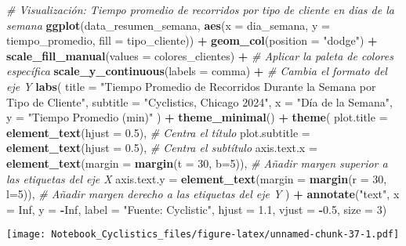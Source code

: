 \documentclass[
]{article}
\newenvironment{Shaded}{\begin{snugshade}}{\end{snugshade}}
\newcommand{\AttributeTok}[1]{\textcolor[rgb]{0.13,0.29,0.53}{#1}}
\newcommand{\CommentTok}[1]{\textcolor[rgb]{0.56,0.35,0.01}{\textit{#1}}}
\newcommand{\ConstantTok}[1]{\textcolor[rgb]{0.56,0.35,0.01}{#1}}
\newcommand{\DecValTok}[1]{\textcolor[rgb]{0.00,0.00,0.81}{#1}}
\newcommand{\FloatTok}[1]{\textcolor[rgb]{0.00,0.00,0.81}{#1}}
\newcommand{\FunctionTok}[1]{\textcolor[rgb]{0.13,0.29,0.53}{\textbf{#1}}}
\newcommand{\NormalTok}[1]{#1}
\newcommand{\SpecialCharTok}[1]{\textcolor[rgb]{0.81,0.36,0.00}{\textbf{#1}}}
\newcommand{\StringTok}[1]{\textcolor[rgb]{0.31,0.60,0.02}{#1}}
\begin{document}
\begin{Shaded}
\begin{Highlighting}[]
\CommentTok{\# Visualización: Tiempo promedio  de recorridos por tipo de cliente en dias de la semana}
\FunctionTok{ggplot}\NormalTok{(data\_resumen\_semana, }\FunctionTok{aes}\NormalTok{(}\AttributeTok{x =}\NormalTok{ dia\_semana, }\AttributeTok{y =}\NormalTok{ tiempo\_promedio, }\AttributeTok{fill =}\NormalTok{ tipo\_cliente)) }\SpecialCharTok{+}
  \FunctionTok{geom\_col}\NormalTok{(}\AttributeTok{position =} \StringTok{"dodge"}\NormalTok{) }\SpecialCharTok{+}
  \FunctionTok{scale\_fill\_manual}\NormalTok{(}\AttributeTok{values =}\NormalTok{ colores\_clientes) }\SpecialCharTok{+} \CommentTok{\# Aplicar la paleta de colores específica}
  \FunctionTok{scale\_y\_continuous}\NormalTok{(}\AttributeTok{labels =}\NormalTok{ comma) }\SpecialCharTok{+} \CommentTok{\# Cambia el formato del eje Y}
  \FunctionTok{labs}\NormalTok{(}
    \AttributeTok{title =} \StringTok{"Tiempo Promedio de Recorridos Durante la Semana por Tipo de Cliente"}\NormalTok{,}
    \AttributeTok{subtitle =} \StringTok{"Cyclistics, Chicago 2024"}\NormalTok{,}
    \AttributeTok{x =} \StringTok{"Día de la Semana"}\NormalTok{, }\AttributeTok{y =} \StringTok{"Tiempo Promedio (min)"}
\NormalTok{  ) }\SpecialCharTok{+}
  \FunctionTok{theme\_minimal}\NormalTok{() }\SpecialCharTok{+}
  \FunctionTok{theme}\NormalTok{( }
    \AttributeTok{plot.title =} \FunctionTok{element\_text}\NormalTok{(}\AttributeTok{hjust =} \FloatTok{0.5}\NormalTok{), }\CommentTok{\# Centra el título }
    \AttributeTok{plot.subtitle =} \FunctionTok{element\_text}\NormalTok{(}\AttributeTok{hjust =} \FloatTok{0.5}\NormalTok{), }\CommentTok{\# Centra el subtítulo}
    \AttributeTok{axis.text.x =} \FunctionTok{element\_text}\NormalTok{(}\AttributeTok{margin =} \FunctionTok{margin}\NormalTok{(}\AttributeTok{t =} \DecValTok{30}\NormalTok{, }\AttributeTok{b=}\DecValTok{5}\NormalTok{)), }\CommentTok{\# Añadir margen superior a las etiquetas del eje X }
    \AttributeTok{axis.text.y =} \FunctionTok{element\_text}\NormalTok{(}\AttributeTok{margin =} \FunctionTok{margin}\NormalTok{(}\AttributeTok{r =} \DecValTok{30}\NormalTok{, }\AttributeTok{l=}\DecValTok{5}\NormalTok{)), }\CommentTok{\# Añadir margen derecho a las etiquetas del eje Y}
\NormalTok{  ) }\SpecialCharTok{+}
  \FunctionTok{annotate}\NormalTok{(}\StringTok{"text"}\NormalTok{, }\AttributeTok{x =} \ConstantTok{Inf}\NormalTok{, }\AttributeTok{y =} \SpecialCharTok{{-}}\ConstantTok{Inf}\NormalTok{, }\AttributeTok{label =} \StringTok{"Fuente: Cyclistic"}\NormalTok{, }\AttributeTok{hjust =} \FloatTok{1.1}\NormalTok{, }\AttributeTok{vjust =} \SpecialCharTok{{-}}\FloatTok{0.5}\NormalTok{, }\AttributeTok{size =} \DecValTok{3}\NormalTok{)}
\end{Highlighting}
\end{Shaded}

\texttt{[image: Notebook\_Cyclistics\_files/figure-latex/unnamed-chunk-37-1.pdf]}
\end{document}
